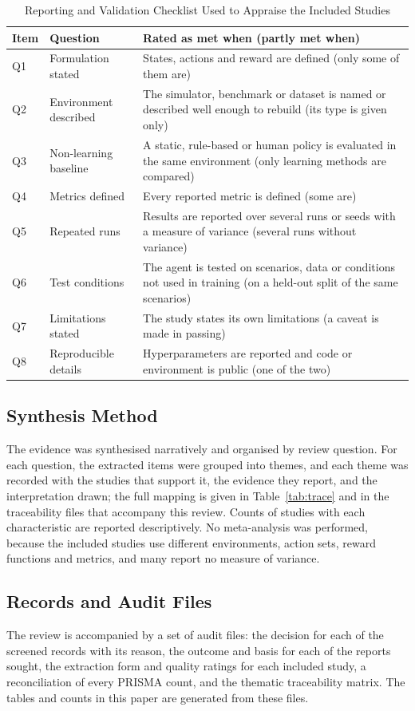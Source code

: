 \begin{table}[!t]
\centering
\caption{Reporting and Validation Checklist Used to Appraise the Included Studies}
\label{tab:checklist}
\footnotesize
\begin{tabularx}{\columnwidth}{@{}lP{1.9cm}L@{}}
\toprule
Item & Question & Rated as met when (partly met when) \\
\midrule
Q1 & Formulation stated & States, actions and reward are defined (only some of them are) \\
Q2 & Environment described & The simulator, benchmark or dataset is named or described well enough to rebuild (its type is given only) \\
Q3 & Non-learning baseline & A static, rule-based or human policy is evaluated in the same environment (only learning methods are compared) \\
Q4 & Metrics defined & Every reported metric is defined (some are) \\
Q5 & Repeated runs & Results are reported over several runs or seeds with a measure of variance (several runs without variance) \\
Q6 & Test conditions & The agent is tested on scenarios, data or conditions not used in training (on a held-out split of the same scenarios) \\
Q7 & Limitations stated & The study states its own limitations (a caveat is made in passing) \\
Q8 & Reproducible details & Hyperparameters are reported and code or environment is public (one of the two) \\
\bottomrule
\end{tabularx}
\end{table}

\subsection{Synthesis Method}

The evidence was synthesised narratively and organised by review question. For each question, the extracted items were grouped into themes, and each theme was recorded with the studies that support it, the evidence they report, and the interpretation drawn; the full mapping is given in Table~\ref{tab:trace} and in the traceability files that accompany this review. Counts of studies with each characteristic are reported descriptively. No meta-analysis was performed, because the included studies use different environments, action sets, reward functions and metrics, and many report no measure of variance.

\subsection{Records and Audit Files}
\label{sec:audit}

The review is accompanied by a set of audit files: the decision for each of the \NScreened{} screened records with its reason, the outcome and basis for each of the \NSought{} reports sought, the extraction form and quality ratings for each included study, a reconciliation of every PRISMA count, and the thematic traceability matrix. The tables and counts in this paper are generated from these files.
